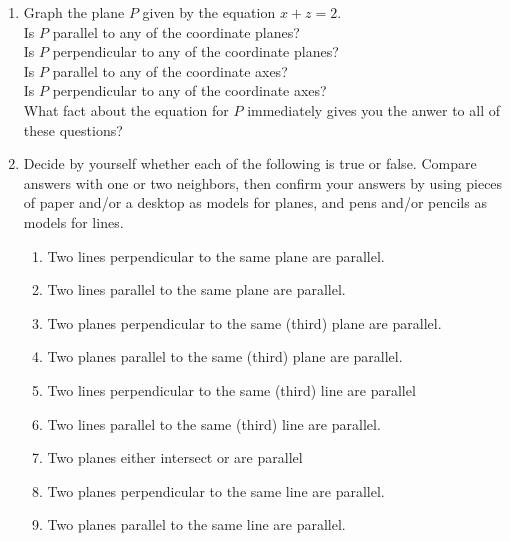 \documentclass[12pt]{article}
\begin{document}
\begin{enumerate}
\item 
Graph the plane $P$ given by the equation  $x+z=2$.\\
Is $P$ parallel to any of the coordinate planes?\\
Is $P$ perpendicular to any of the coordinate planes?\\
Is $P$ parallel to any of the coordinate axes?\\
Is $P$ perpendicular to any of the coordinate axes?\\
What fact about the equation for $P$ immediately gives you the anwer to all
of these questions?
\vfill\eject
\item Decide by yourself whether each of the following is true or false. 
Compare answers with one or two neighbors, then
confirm your answers by using pieces of paper and/or a desktop
as models for planes, and pens and/or pencils as models for lines. 
\begin{enumerate} 
 \item Two lines perpendicular to the same plane are parallel.
 \item Two lines parallel to the same plane are parallel.
 \item Two planes perpendicular to the same (third) plane are parallel.
 \item Two planes parallel to the same (third) plane are parallel.
 \item Two lines perpendicular to the same (third) line are parallel
 \item Two lines parallel to the same (third) line are parallel.
 \item Two planes either intersect or are parallel
 \item Two planes perpendicular to the same line are parallel.
 \item Two planes parallel to the same line are parallel.
 \end{enumerate}

\end{enumerate}
\end{document}

